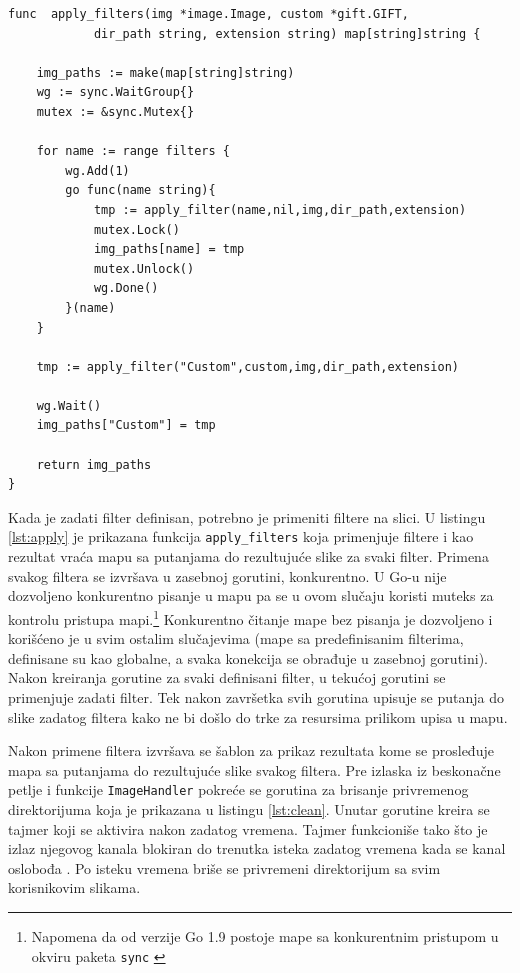 \documentclass[12pt,oneside]{memoir}
\begin{document}
\begin{center}
\begin{lstlisting}[caption=Funkcija za paralelnu primenu filtera,label={lst:apply},  backgroundcolor=\color{background}]
func  apply_filters(img *image.Image, custom *gift.GIFT, 
			dir_path string, extension string) map[string]string {

	img_paths := make(map[string]string)
	wg := sync.WaitGroup{}
	mutex := &sync.Mutex{}

	for name := range filters {
		wg.Add(1)
		go func(name string){
			tmp := apply_filter(name,nil,img,dir_path,extension)
			mutex.Lock()
			img_paths[name] = tmp
			mutex.Unlock()
			wg.Done()
		}(name)
	}

	tmp := apply_filter("Custom",custom,img,dir_path,extension)

	wg.Wait()
	img_paths["Custom"] = tmp

	return img_paths
}
\end{lstlisting}
\end{center}

Kada je zadati filter definisan, potrebno je primeniti filtere na slici. U listingu \ref{lst:apply} je prikazana funkcija  \texttt{apply\_filters} koja primenjuje filtere i kao rezultat vraća mapu sa putanjama do rezultujuće slike za svaki filter. Primena svakog filtera se izvršava u zasebnoj gorutini, konkurentno. U Go-u nije dozvoljeno konkurentno pisanje u mapu pa se u ovom slučaju koristi muteks za kontrolu pristupa mapi.\footnote{ Napomena da od verzije Go 1.9 postoje mape sa konkurentnim pristupom u okviru paketa \texttt{sync} \cite{sync}} Konkurentno čitanje mape bez pisanja je dozvoljeno i korišćeno je u svim ostalim slučajevima (mape sa predefinisanim filterima, definisane su kao globalne, a svaka konekcija se obrađuje u zasebnoj gorutini). Nakon kreiranja gorutine za svaki definisani filter, u tekućoj gorutini se primenjuje zadati filter. Tek nakon završetka svih gorutina upisuje se putanja do slike zadatog filtera kako ne bi došlo do trke za resursima prilikom upisa u mapu. 

Nakon primene filtera izvršava se šablon za prikaz rezultata kome se prosleđuje mapa sa putanjama do rezultujuće slike svakog filtera. Pre izlaska iz beskonačne petlje i funkcije  \texttt{ImageHandler} pokreće se gorutina za brisanje privremenog direktorijuma koja je prikazana u listingu \ref{lst:clean}. Unutar gorutine kreira se tajmer koji se aktivira nakon zadatog vremena. Tajmer funkcioniše tako što je izlaz njegovog kanala blokiran do trenutka isteka zadatog vremena kada se kanal oslobođa \cite{time}. Po isteku vremena briše se privremeni direktorijum sa svim korisnikovim slikama. 
\end{document}
